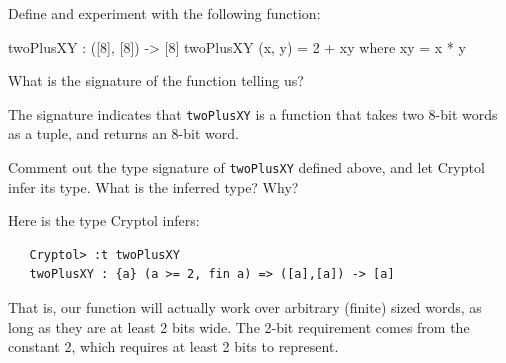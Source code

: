 \begin{Exercise}\label{ex:fn:1}
Define and experiment with the following function:
\begin{code}
  twoPlusXY : ([8], [8]) -> [8]
  twoPlusXY (x, y) = 2 + xy
     where xy = x * y
\end{code}
What is the signature of the function telling us?
\end{Exercise}
\begin{Answer}
  The signature indicates that {\tt twoPlusXY} is a function that
  takes two 8-bit words as a tuple, and returns an 8-bit word.
\end{Answer}

\begin{Exercise}\label{ex:fn:1.1}
  Comment out the type signature of {\tt twoPlusXY} defined above, and
  let Cryptol infer its type. What is the inferred type? Why?
\end{Exercise}
\begin{Answer}
Here is the type Cryptol infers:
\begin{verbatim}
   Cryptol> :t twoPlusXY
   twoPlusXY : {a} (a >= 2, fin a) => ([a],[a]) -> [a]
\end{verbatim}
That is, our function will actually work over arbitrary (finite) sized
words, as long as they are at least 2 bits wide. The 2-bit requirement
comes from the constant 2, which requires at least 2 bits to
represent.
\end{Answer}

